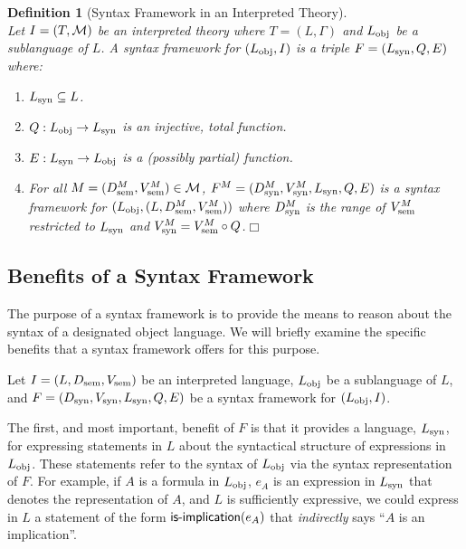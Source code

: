 \documentclass[11pt,fleqn]{article}
\newcommand{\be}{\begin{enumerate}}
\newcommand{\ee}{\end{enumerate}}
\newcommand{\sM}{\mbox{$\cal M$}}
\newcommand{\mname}[1]{\mbox{\sf #1}}
\newcommand{\tarrow}{\rightarrow}
\newtheorem{df}[thm]{Definition}
\begin{document}
\begin{df}[Syntax Framework in an Interpreted Theory] \label{df:syn-frame-thy} \em
\hspace{2ex}\\
Let $I=(T,\sM)$ be an interpreted theory where $T = (L,\Gamma)$ and
$L_{\rm obj}$ be a sublanguage of $L$.  A \emph{syntax framework} for
$(L_{\rm obj},I)$ is a triple $F=(L_{\rm syn}, Q, E)$ where:

\be

  \item $L_{\rm syn} \subseteq L$.

  \item $Q : L_{\rm obj} \tarrow L_{\rm syn}$ is an injective, total
    function.

  \item $E : L_{\rm syn} \tarrow L_{\rm obj}$ is a (possibly partial)
    function.

  \item For all $M = (D^{M}_{\rm sem},V^{M}_{\rm sem}) \in \sM$,
    $F^M=(D^{M}_{\rm syn},V^{M}_{\rm syn}, L_{\rm syn}, Q, E)$ is a
    syntax framework for $(L_{\rm obj},(L,D^{M}_{\rm sem},V^{M}_{\rm
      sem}))$ where $D^{M}_{\rm syn}$ is the range of $V^{M}_{\rm sem}$
    restricted to $L_{\rm syn}$ and $V^{M}_{\rm syn} = V^{M}_{\rm sem}
    \circ Q$.\hfill $\Box$

\ee 
\end{df}

\subsection{Benefits of a Syntax Framework}

The purpose of a syntax framework is to provide the means to reason
about the syntax of a designated object language.  We will briefly
examine the specific benefits that a syntax framework offers for this
purpose.

Let $I=(L,D_{\rm sem},V_{\rm sem})$ be an interpreted language,
$L_{\rm obj}$ be a sublanguage of $L$, and $F=(D_{\rm syn}, V_{\rm
  syn}, L_{\rm syn}, Q, E)$ be a syntax framework for $(L_{\rm
  obj},I)$.

The first, and most important, benefit of $F$ is that it provides a
language, $L_{\rm syn}$, for expressing statements in $L$ about the
syntactical structure of expressions in $L_{\rm obj}$.  These
statements refer to the syntax of $L_{\rm obj}$ via the syntax
representation of $F$.  For example, if $A$ is a formula in $L_{\rm
  obj}$, $e_A$ is an expression in $L_{\rm syn}$ that denotes the
representation of $A$, and $L$ is sufficiently expressive, we could
express in $L$ a statement of the form $\mname{is-implication}(e_A)$
that \emph{indirectly} says ``$A$ is an implication''.
\end{document}
